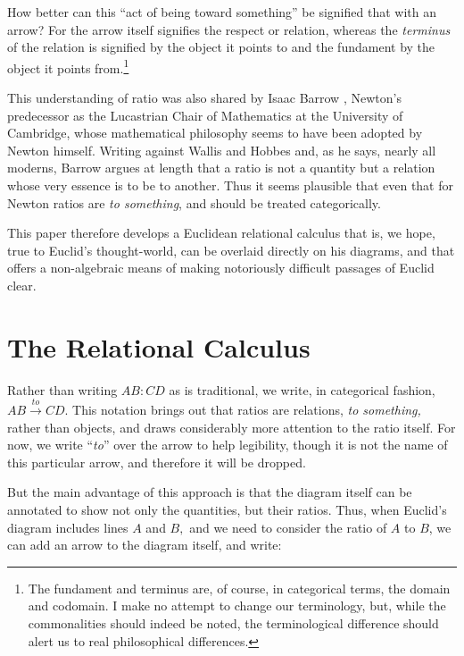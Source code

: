 \documentclass[11pt]{article}
\begin{document}
\begin{quotation}
\end{quotation}

How better can this ``act of being toward something'' be signified that with an arrow? For the arrow itself signifies the respect or relation, whereas the \textit{terminus} of the relation is signified by the object it points to and the fundament by the object it points from.\footnote{The fundament and terminus are, of course, in categorical terms, the domain and codomain. I make no attempt to change our terminology, but, while the commonalities should indeed be noted, the terminological difference should alert us to real philosophical differences.}

This understanding of ratio was also shared by Isaac Barrow \citep{barrow-ML}, Newton's predecessor as the Lucastrian Chair of Mathematics at the University of Cambridge, whose mathematical philosophy seems to have been adopted by Newton himself. Writing against Wallis and Hobbes and, as he says, nearly all moderns, Barrow argues at length that a ratio is not a quantity but a relation whose very essence is to be to another. Thus it seems plausible that even that for Newton ratios are \textit{to something}, and should be treated categorically.

This paper therefore develops a Euclidean relational calculus that is, we hope, true to Euclid's thought-world, can be overlaid directly on his diagrams, and that offers a non-algebraic means of making notoriously difficult passages of Euclid clear.

\section{The Relational Calculus}

Rather than writing $AB:CD$ as is traditional, we write, in categorical fashion, \(AB\xrightarrow{to} CD\). This notation brings out that ratios are relations, \textit{to something,} rather than objects, and draws considerably more attention to the ratio itself. For now, we write ``\textit{to}'' over the arrow to help legibility, though it is not the name of this particular arrow, and therefore it will be dropped.

But the main advantage of this approach is that the diagram itself can be annotated to show not only the quantities, but their ratios. Thus, when Euclid's diagram includes lines $A$ and $B,$ and we need to consider the ratio of $A$ to $B$, we can add an arrow to the diagram itself, and write:
\end{document}
